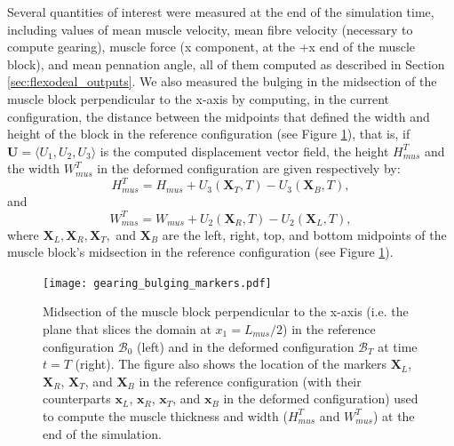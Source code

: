 \documentclass{sfuthesis}
\numberwithin{equation}{section}
\numberwithin{figure}{chapter}
\numberwithin{table}{chapter}
\theoremstyle{definition}
\def\*#1{{\mathbf{#1}}} %
\newcommand{\B}{\mathcal{B}}
\begin{document}
Several quantities of interest were measured at the end of the simulation time, including values of mean muscle velocity, mean fibre velocity (necessary to compute gearing), muscle force (x component, at the +x end of the muscle block), and mean pennation angle, all of them computed as described in Section \ref{sec:flexodeal_outputs}. We also measured the bulging in the midsection of the muscle block perpendicular to the x-axis by computing, in the current configuration, the distance between the midpoints that defined the width and height of the block in the reference configuration (see Figure \ref{fig:bulging_diagram}), that is, if $\*U = \langle U_1,U_2,U_3 \rangle$ is the computed displacement vector field, the height $H_{mus}^T$ and the width $W_{mus}^T$ in the deformed configuration are given respectively by: 
\begin{equation}
    H_{mus}^T = H_{mus} + U_3(\*X_T, T) - U_3(\*X_B, T),
\end{equation}
and
\begin{equation}
    W_{mus}^T = W_{mus} + U_2(\*X_R, T) - U_2(\*X_L, T),
\end{equation}
where $\*X_L, \*X_R, \*X_T,$ and $\*X_B$ are the left, right, top, and bottom midpoints of the muscle block's midsection in the reference configuration (see Figure \ref{fig:bulging_diagram}).

\begin{figure}
    \centering
    \texttt{[image: gearing\_bulging\_markers.pdf]}
    \caption{Midsection of the muscle block perpendicular to the x-axis (i.e. the plane that slices the domain at $x_1 = L_{mus}/2$) in the reference configuration $\B_0$ (left) and in the deformed configuration $\B_T$ at time $t=T$ (right). The figure also shows the location of the markers $\*X_L$, $\*X_R$, $\*X_T$, and $\*X_B$ in the reference configuration (with their counterparts $\*x_L$, $\*x_R$, $\*x_T$, and $\*x_B$ in the deformed configuration) used to compute the muscle thickness and width ($H_{mus}^T$ and $W_{mus}^T$) at the end of the simulation.\label{fig:bulging_diagram}}
\end{figure}
\end{document}
